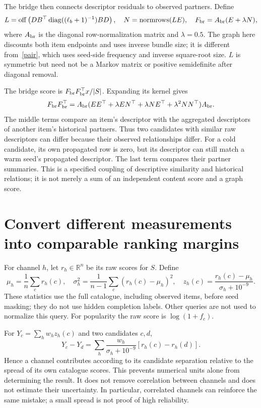 \documentclass[11pt,a4paper]{article}
\newcommand{\diag}{\operatorname{diag}}
\newcommand{\off}{\operatorname{off}}
\newcommand{\normrows}{\operatorname{normrows}}
\begin{document}
The bridge then connects descriptor residuals to observed partners. Define
\begin{equation}
 L=\off\left(DB^\top\diag((\ell_b+1)^{-1})BD\right),\quad
 N=\normrows(LE),\quad F_{\rm br}=A_{\rm br}(E+\lambda N),
\end{equation}
where $A_{\rm br}$ is the diagonal row-normalization matrix and $\lambda=0.5$.
The graph here discounts both item endpoints and uses inverse bundle size;
it is different from~\eqref{pair}, which uses seed-side frequency and inverse
square-root size. $L$ is symmetric but need not be a Markov matrix or positive
semidefinite after diagonal removal.

The bridge score is $F_{\rm br}F_{\rm br}^\top x/|S|$. Expanding its kernel gives
\begin{equation}\label{bridge}
 F_{\rm br}F_{\rm br}^\top=A_{\rm br}
 (EE^\top+\lambda EN^\top+\lambda NE^\top+\lambda^2NN^\top)A_{\rm br}.
\end{equation}
The middle terms compare an item's descriptor with the aggregated descriptors of
another item's historical partners. Thus two candidates with similar raw
descriptors can differ because their observed relationships differ. For a cold
candidate, its own propagated row is zero, but its descriptor can still match a
warm seed's propagated descriptor. The last term compares their partner summaries.
This is a specified coupling of descriptive similarity and historical relations;
it is not merely a sum of an independent content score and a graph score.

\section{Convert different measurements into comparable ranking margins}\label{standardize}
For channel $h$, let $r_h\in\mathbb R^n$ be its raw scores for $S$. Define
\begin{equation}
 \mu_h=\frac1n\sum_cr_h(c),\quad
 \sigma_h^2=\frac1{n-1}\sum_c(r_h(c)-\mu_h)^2,\quad
 z_h(c)=\frac{r_h(c)-\mu_h}{\sigma_h+10^{-9}}.
\end{equation}
These statistics use the full catalogue, including observed items, before seed
masking; they do not use hidden completion labels. Other queries are not used to
normalize this query. For popularity the raw score is $\log(1+f_c)$.

For $Y_c=\sum_hw_hz_h(c)$ and two candidates $c,d$,
\begin{equation}\label{margin}
 Y_c-Y_d=\sum_h\frac{w_h}{\sigma_h+10^{-9}}[r_h(c)-r_h(d)].
\end{equation}
Hence a channel contributes according to its candidate separation relative to the
spread of its own catalogue scores. This prevents numerical units alone from
determining the result. It does not remove correlation between channels and does
not estimate their uncertainty. In particular, correlated channels can reinforce
the same mistake; a small spread is not proof of high reliability.
\end{document}
